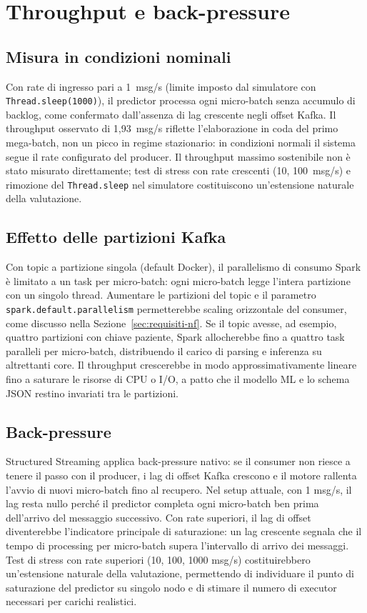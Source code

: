 \section{Throughput e back-pressure}\label{sec:throughput}

\subsection{Misura in condizioni nominali}

Con rate di ingresso pari a 1~msg/s (limite imposto dal simulatore con \texttt{Thread.sleep(1000)}), il predictor processa ogni micro-batch senza accumulo di backlog, come confermato dall'assenza di lag crescente negli offset Kafka.
Il throughput osservato di 1,93~msg/s riflette l'elaborazione in coda del primo mega-batch, non un picco in regime stazionario: in condizioni normali il sistema segue il rate configurato del producer.
Il throughput massimo sostenibile non è stato misurato direttamente; test di stress con rate crescenti (10, 100~msg/s) e rimozione del \texttt{Thread.sleep} nel simulatore costituiscono un'estensione naturale della valutazione.

\subsection{Effetto delle partizioni Kafka}

Con topic a partizione singola (default Docker), il parallelismo di consumo Spark è limitato a un task per micro-batch: ogni micro-batch legge l'intera partizione con un singolo thread.
Aumentare le partizioni del topic e il parametro \texttt{spark.default.parallelism} permetterebbe scaling orizzontale del consumer, come discusso nella Sezione~\ref{sec:requisiti-nf}.
Se il topic avesse, ad esempio, quattro partizioni con chiave paziente, Spark allocherebbe fino a quattro task paralleli per micro-batch, distribuendo il carico di parsing e inferenza su altrettanti core.
Il throughput crescerebbe in modo approssimativamente lineare fino a saturare le risorse di CPU o I/O, a patto che il modello ML e lo schema JSON restino invariati tra le partizioni.

\subsection{Back-pressure}

Structured Streaming applica back-pressure nativo: se il consumer non riesce a tenere il passo con il producer, i lag di offset Kafka crescono e il motore rallenta l'avvio di nuovi micro-batch fino al recupero.
Nel setup attuale, con 1 msg/s, il lag resta nullo perché il predictor completa ogni micro-batch ben prima dell'arrivo del messaggio successivo.
Con rate superiori, il lag di offset diventerebbe l'indicatore principale di saturazione: un lag crescente segnala che il tempo di processing per micro-batch supera l'intervallo di arrivo dei messaggi.
Test di stress con rate superiori (10, 100, 1000 msg/s) costituirebbero un'estensione naturale della valutazione, permettendo di individuare il punto di saturazione del predictor su singolo nodo e di stimare il numero di executor necessari per carichi realistici.

